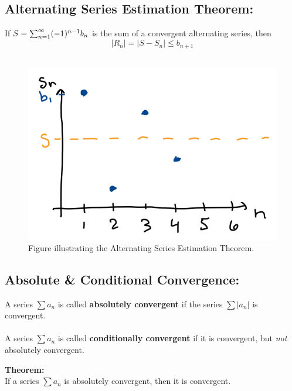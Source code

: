 \documentclass[10pt]{article}
\begin{document}
 \vspace*{.5in}

\subsection*{Alternating Series Estimation Theorem:}
If \(S = \sum_{n=1}^\infty (-1)^{n-1} b_n\) is the sum of a convergent alternating series, then 
\[
|R_n| = |S - S_n| \leq b_{n+1}
\]
~\\
\begin{figure}[h]
\includegraphics[width=.75\columnwidth]{Ch8s4-ASET.png}
\caption{Figure illustrating the Alternating Series Estimation Theorem.}
\end{figure}



\subsection*{Absolute \& Conditional Convergence:}
A series \(\sum a_n\) is called \textbf{absolutely convergent} if the series \(\sum |a_n|\) is convergent.\\~\\

A series \(\sum a_n\) is called \textbf{conditionally convergent} if it is convergent, but \textit{not} absolutely convergent.


\textbf{Theorem:}\\
If a series \(\sum a_n\) is absolutely convergent, then it is convergent.

\end{document}
